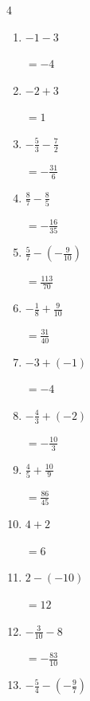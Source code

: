 \begin{multicols}{4}
\begin{enumerate}
\columnbreak %

  \item $\displaystyle -1 - 3$

        $\displaystyle =-4$

  \item $\displaystyle -2 + 3$

        $\displaystyle =1$

  \item $\displaystyle -\frac{5}{3} - \frac{7}{2}$

        $\displaystyle =-\frac{31}{6}$

  \item $\displaystyle \frac{8}{7} - \frac{8}{5}$

        $\displaystyle =-\frac{16}{35}$

  \item $\displaystyle \frac{5}{7} - \left(-\frac{9}{10}\right)$

        $\displaystyle =\frac{113}{70}$

  \item $\displaystyle -\frac{1}{8} + \frac{9}{10}$

        $\displaystyle =\frac{31}{40}$

  \item $\displaystyle -3 + \left(-1\right)$

        $\displaystyle =-4$

  \item $\displaystyle -\frac{4}{3} + \left(-2\right)$

        $\displaystyle =-\frac{10}{3}$

  \item $\displaystyle \frac{4}{5} + \frac{10}{9}$

        $\displaystyle =\frac{86}{45}$

  \item $\displaystyle 4 + 2$

        $\displaystyle =6$

\columnbreak %

  \item $\displaystyle 2 - \left(-10\right)$

        $\displaystyle =12$

  \item $\displaystyle -\frac{3}{10} - 8$

        $\displaystyle =-\frac{83}{10}$

  \item $\displaystyle -\frac{5}{4} - \left(-\frac{9}{7}\right)$


\end{enumerate}
\end{multicols}
